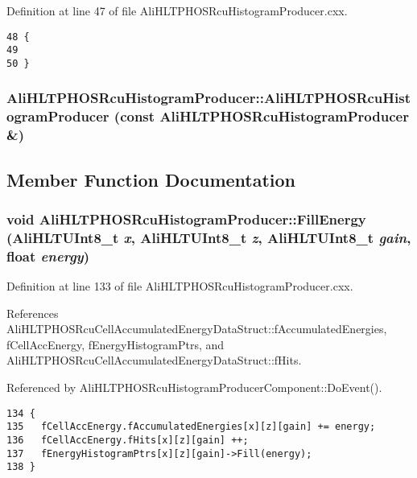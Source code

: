 Definition at line 47 of file Ali\-HLTPHOSRcu\-Histogram\-Producer.cxx.

\footnotesize\begin{verbatim}48 {
49 
50 }
\end{verbatim}\normalsize 


\subsubsection{\setlength{\rightskip}{0pt plus 5cm}Ali\-HLTPHOSRcu\-Histogram\-Producer::Ali\-HLTPHOSRcu\-Histogram\-Producer (const {\bf Ali\-HLTPHOSRcu\-Histogram\-Producer} \&)\hspace{0.3cm}{\tt  [private]}}\label{classAliHLTPHOSRcuHistogramProducer_d0}




\subsection{Member Function Documentation}
\subsubsection{\setlength{\rightskip}{0pt plus 5cm}void Ali\-HLTPHOSRcu\-Histogram\-Producer::Fill\-Energy ({\bf Ali\-HLTUInt8\_\-t} {\em x}, {\bf Ali\-HLTUInt8\_\-t} {\em z}, {\bf Ali\-HLTUInt8\_\-t} {\em gain}, float {\em energy})}\label{classAliHLTPHOSRcuHistogramProducer_a11}




Definition at line 133 of file Ali\-HLTPHOSRcu\-Histogram\-Producer.cxx.

References Ali\-HLTPHOSRcu\-Cell\-Accumulated\-Energy\-Data\-Struct::f\-Accumulated\-Energies, f\-Cell\-Acc\-Energy, f\-Energy\-Histogram\-Ptrs, and Ali\-HLTPHOSRcu\-Cell\-Accumulated\-Energy\-Data\-Struct::f\-Hits.

Referenced by Ali\-HLTPHOSRcu\-Histogram\-Producer\-Component::Do\-Event().

\footnotesize\begin{verbatim}134 {
135   fCellAccEnergy.fAccumulatedEnergies[x][z][gain] += energy;
136   fCellAccEnergy.fHits[x][z][gain] ++; 
137   fEnergyHistogramPtrs[x][z][gain]->Fill(energy);
138 }
\end{verbatim}\normalsize 


